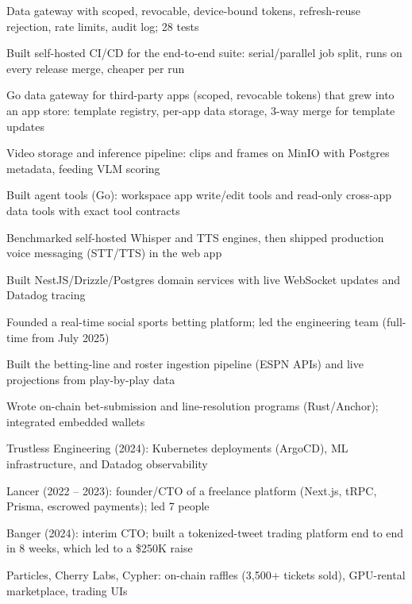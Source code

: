 \documentclass[print]{jack-resume}
\begin{document}
\begin{tightemize}
    \item Data gateway with scoped, revocable, device-bound tokens, refresh-reuse rejection, rate limits, audit log; 28 tests
    \item Built self-hosted CI/CD for the end-to-end suite: serial/parallel job split, runs on every release merge, cheaper per run
    \item Go data gateway for third-party apps (scoped, revocable tokens) that grew into an app store: template registry, per-app data storage, 3-way merge for template updates
    \item Video storage and inference pipeline: clips and frames on MinIO with Postgres metadata, feeding VLM scoring
    \item Built agent tools (Go): workspace app write/edit tools and read-only cross-app data tools with exact tool contracts
    \item Benchmarked self-hosted Whisper and TTS engines, then shipped production voice messaging (STT/TTS) in the web app
\end{tightemize}
\sectionsep

\begin{tightemize}
    \item Built NestJS/Drizzle/Postgres domain services with live WebSocket updates and Datadog tracing
    \item Founded a real-time social sports betting platform; led the engineering team (full-time from July 2025)
    \item Built the betting-line and roster ingestion pipeline (ESPN APIs) and live projections from play-by-play data
    \item Wrote on-chain bet-submission and line-resolution programs (Rust/Anchor); integrated embedded wallets
\end{tightemize}
\sectionsep

\begin{tightemize}
    \item Trustless Engineering (2024): Kubernetes deployments (ArgoCD), ML infrastructure, and Datadog observability
    \item Lancer (2022 – 2023): founder/CTO of a freelance platform (Next.js, tRPC, Prisma, escrowed payments); led 7 people
    \item Banger (2024): interim CTO; built a tokenized-tweet trading platform end to end in 8 weeks, which led to a \$250K raise
    \item Particles, Cherry Labs, Cypher: on-chain raffles (3,500+ tickets sold), GPU-rental marketplace, trading UIs
\end{tightemize}
\sectionsep
\end{document}
